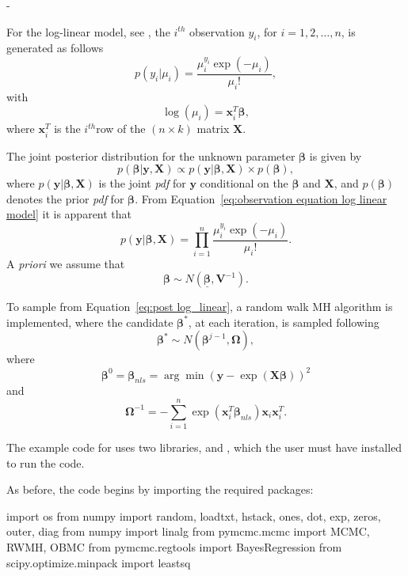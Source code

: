 -\documentclass[article]{jss}
\begin{document}
For the log-linear model, see \citet{GelmanCarlinSternRubin2004}, the
$i^{th}$ observation $y_{i}$, for $i=1,2,\dots,n$, is generated as
follows
\begin{equation}
  p(y_{i}|\mu_{i})=\frac{\mu_{i}^{y_{i}}\exp(-\mu_{i})}{\mu_{i}!},\label{eq:observation
    equation log linear model}
\end{equation} with \[
\log(\mu_{i})=\bm{x}_{i}^{T}\bm{\beta},\] where $\bm{x}_{i}^{T}$ is
the $i^{th}$row of the $\left(n\times k\right)$ matrix $\bm{X}.$

The joint posterior distribution for the unknown parameter
$\bm{\beta}$ is given by
\begin{equation}
  p(\bm{\beta}|\bm{y},\bm{X})\propto p(\bm{y}|\bm{\beta},\bm{X})\times
  p(\bm{\beta}),
\label{eq:post log_linear}
\end{equation} 
where $p(\bm{y}|\bm{\beta},\bm{X})$ is the joint \emph{pdf }for
$\bm{y}$ conditional on the $\bm{\beta}$ and $\bm{X}$, and
$p(\bm{\beta})$ denotes the prior \emph{pdf }for $\bm{\beta}.$ From
Equation~\ref{eq:observation equation log linear model} it is apparent that\[
p(\bm{y}|\bm{\beta},\bm{X})=\prod_{i=1}^{n}\frac{\mu_{i}^{y_{i}}\exp(-\mu_{i})}{\mu_{i}!}.\]
A \emph{priori }we assume that \[ \bm{\beta}\sim
N(\bm{\underline{\bm{\beta}}},\bm{V}^{-1}).\]

To sample from Equation~\ref{eq:post log_linear}, a random walk MH algorithm
is implemented, where the candidate $\bm{\beta}^{*}$, at each
iteration, is sampled following \begin{equation} \bm{\beta}^{*}\sim
  N\left(\bm{\beta}^{j-1},\bm{\Omega}\right),\label{eq:candidate
    log-linear}\end{equation} where\[
\bm{\beta}^{0}=\bm{\beta}_{nls}=\arg\min\left(\bm{y}-\exp\left(\bm{X}\bm{\beta}\right)\right)^{2}\]
and\[
\bm{\Omega}^{-1}=-\sum_{i=1}^{n}\exp\left(\bm{x}_{i}^{T}\bm{\beta}_{nls}\right)\bm{x}_{i}\bm{x}_{i}^{T}.\]


The example code for  uses two 
libraries,  and , which the user must have
installed to run the code.  

As before, the code begins by importing the required packages:

\begin{Code}
import os
from numpy import random, loadtxt, hstack, ones, dot, exp, zeros, outer, diag
from numpy import linalg
from pymcmc.mcmc import MCMC, RWMH, OBMC
from pymcmc.regtools import BayesRegression
from scipy.optimize.minpack import leastsq
\end{Code}
\end{document}
